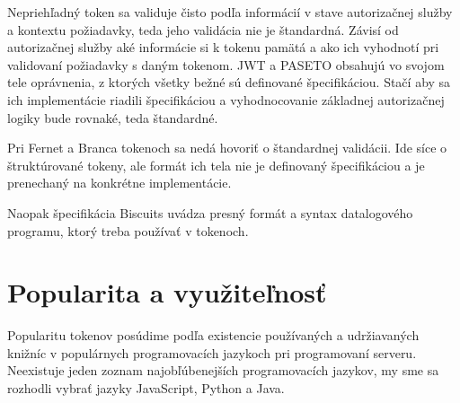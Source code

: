 Nepriehľadný token sa validuje čisto podľa informácií v stave autorizačnej služby a kontextu požiadavky, teda jeho validácia nie je štandardná. Závisí od autorizačnej služby aké informácie si k tokenu pamätá a ako ich vyhodnotí pri validovaní požiadavky s daným tokenom. JWT a PASETO obsahujú vo svojom tele oprávnenia, z ktorých všetky bežné sú definované špecifikáciou. Stačí aby sa ich implementácie riadili špecifikáciou a vyhodnocovanie základnej autorizačnej logiky bude rovnaké, teda štandardné.

Pri Fernet a Branca tokenoch sa nedá hovoriť o štandardnej validácii. Ide síce o štruktúrované tokeny, ale formát ich tela nie je definovaný špecifikáciou a je prenechaný na konkrétne implementácie.

Naopak špecifikácia Biscuits uvádza presný formát a syntax datalogového programu, ktorý treba používať v tokenoch.

\section{Popularita a využiteľnosť}

Popularitu tokenov posúdime podľa existencie používaných a udržiavaných knižníc v populárnych programovacích jazykoch pri programovaní serveru. Neexistuje jeden zoznam najobľúbenejších programovacích jazykov, my sme sa rozhodli vybrať jazyky JavaScript, Python a Java.

